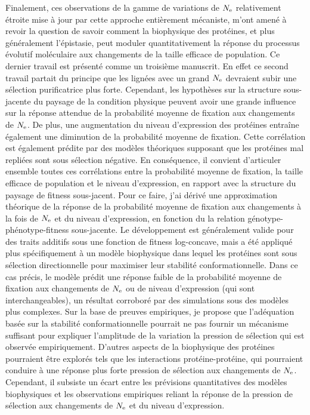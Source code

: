 Finalement, ces observations de la gamme de variations de $N_{\textrm{e}}$ relativement étroite mise à jour par cette approche entièrement mécaniste, m'ont amené à revoir la question de savoir comment la biophysique des protéines, et plus généralement l'épistasie, peut moduler quantitativement la réponse du processus évolutif moléculaire aux changements de la taille efficace de population.
Ce dernier travail est présenté comme un troisième manuscrit.
En effet ce second travail partait du principe que les lignées avec un grand $N_{\textrm{e}}$ devraient subir une sélection purificatrice plus forte.
Cependant, les hypothèses sur la structure sous-jacente du paysage de la condition physique peuvent avoir une grande influence sur la réponse attendue de la probabilité moyenne de fixation aux changements de $N_{\textrm{e}}$.
De plus, une augmentation du niveau d'expression des protéines entraîne également une diminution de la probabilité moyenne de fixation.
Cette corrélation est également prédite par des modèles théoriques supposant que les protéines mal repliées sont sous sélection négative.
En conséquence, il convient d'articuler ensemble toutes ces corrélations entre la probabilité moyenne de fixation, la taille efficace de population et le niveau d'expression, en rapport avec la structure du paysage de fitness sous-jacent.
Pour ce faire, j'ai dérivé une approximation théorique de la réponse de la probabilité moyenne de fixation aux changements à la fois de $N_{\textrm{e}}$ et du niveau d'expression, en fonction du la relation génotype-phénotype-fitness sous-jacente.
Le développement est généralement valide pour des traits additifs sous une fonction de fitness log-concave, mais a été appliqué plus spécifiquement à un modèle biophysique dans lequel les protéines sont sous sélection directionnelle pour maximiser leur stabilité conformationnelle.
Dans ce cas précis, le modèle prédit une réponse faible de la probabilité moyenne de fixation aux changements de $N_{\textrm{e}}$ ou de niveau d'expression (qui sont interchangeables), un résultat corroboré par des simulations sous des modèles plus complexes.
Sur la base de preuves empiriques, je propose que l'adéquation basée sur la stabilité conformationnelle pourrait ne pas fournir un mécanisme suffisant pour expliquer l'amplitude de la variation la pression de sélection qui est observée empiriquement.
D'autres aspects de la biophysique des protéines pourraient être explorés tels que les interactions protéine-protéine, qui pourraient conduire à une réponse plus forte pression de sélection aux changements de $N_{\textrm{e}}$.
Cependant, il subsiste un écart entre les prévisions quantitatives des modèles biophysiques et les observations empiriques reliant la réponse de la pression de sélection aux changements de $N_{\textrm{e}}$ et du niveau d'expression.

